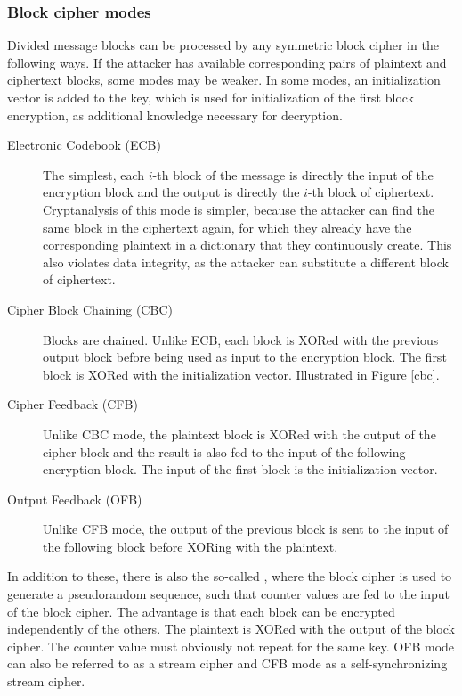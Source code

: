 \subsubsection{Block cipher modes}
Divided message blocks can be processed by any symmetric block cipher
in the following ways. If the attacker has available corresponding pairs of plaintext and ciphertext blocks,
some modes may be weaker. In some modes, an initialization vector is added to the key, which is
used for initialization of the first block encryption, as additional knowledge necessary for decryption.
\begin{description}
  \item[Electronic Codebook (ECB)] The simplest, each $i$-th block of the message is directly the input
  of the encryption block and the output
  is directly the $i$-th block of ciphertext. Cryptanalysis of this mode is simpler,
  because the attacker can find the same block in the ciphertext again, for which
  they already have the corresponding plaintext in a dictionary that they continuously create.
  This also violates data integrity, as the attacker can substitute a different block of ciphertext.
  \item[Cipher Block Chaining (CBC)] Blocks are chained. Unlike ECB, each block is XORed
  with the previous output block before being used as input to the encryption block.
  The first block is XORed with the initialization vector. Illustrated in Figure \ref{cbc}.
  \item[Cipher Feedback (CFB)] Unlike CBC mode, the plaintext block is XORed with the output
  of the cipher block and the result is also fed to the input of the following encryption block. The input of the first block is
  the initialization vector.
  \item[Output Feedback (OFB)] Unlike CFB mode, the output of the previous block is sent to the input of the following block
  before XORing with the plaintext.
\end{description}


In addition to these, there is also the so-called , where the block cipher is used to generate a pseudorandom
sequence, such that counter values are fed to the input of the block cipher. The advantage is that each block can
be encrypted independently of the others. The plaintext is XORed with the output of the block cipher.
The counter value must obviously not repeat for the same key.
OFB mode can also be referred to as a stream cipher and CFB mode as a self-synchronizing stream cipher.

